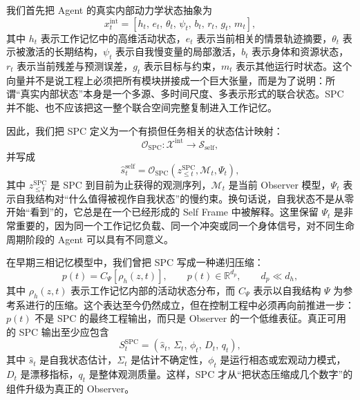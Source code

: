 我们首先把 Agent 的真实内部动力学状态抽象为
\begin{equation}
x_t^{\mathrm{int}}
=
\left[
h_t,\,
e_t,\,
\theta_t,\,
\psi_t,\,
b_t,\,
r_t,\,
g_t,\,
m_t
\right],
\end{equation}
其中 $h_t$ 表示工作记忆中的高维活动状态，$e_t$ 表示当前相关的情景轨迹摘要，$\theta_t$ 表示被激活的长期结构，$\psi_t$ 表示自我慢变量的局部激活，$b_t$ 表示身体和资源状态，$r_t$ 表示当前残差与预测误差，$g_t$ 表示目标与约束，$m_t$ 表示其他运行时状态。这个向量并不是说工程上必须把所有模块拼接成一个巨大张量，而是为了说明：所谓“真实内部状态”本身是一个多源、多时间尺度、多表示形式的联合状态。SPC 并不能、也不应该把这一整个联合空间完整复制进入工作记忆。

因此，我们把 SPC 定义为一个有损但任务相关的状态估计映射：
\begin{equation}
\mathcal O_{\mathrm{SPC}}:
\mathcal X^{\mathrm{int}}
\longrightarrow
\mathcal S_{\mathrm{self}},
\end{equation}
并写成
\begin{equation}
\hat s_t^{\mathrm{self}}
=
\mathcal O_{\mathrm{SPC}}
\left(
z_{\leq t}^{\mathrm{SPC}},
\mathcal M_t,
\Psi_t
\right),
\end{equation}
其中 $z_{\leq t}^{\mathrm{SPC}}$ 是 SPC 到目前为止获得的观测序列，$\mathcal M_t$ 是当前 Observer 模型，$\Psi_t$ 表示自我结构对“什么值得被视作自我状态”的慢约束。换句话说，自我状态不是从零开始“看到”的，它总是在一个已经形成的 Self Frame 中被解释。这里保留 $\Psi_t$ 是非常重要的，因为同一个工作记忆负载、同一个冲突或同一个身体信号，对不同生命周期阶段的 Agent 可以具有不同意义。

在早期三相记忆模型中，我们曾把 SPC 写成一种递归压缩：
\begin{equation}
p(t)
=
C_{\Psi}
\left[
\rho_h(z,t)
\right],
\qquad
p(t)\in\mathbb R^{d_p},
\qquad
d_p\ll d_h,
\end{equation}
其中 $\rho_h(z,t)$ 表示工作记忆内部的活动状态分布，而 $C_{\Psi}$ 表示以自我结构 $\Psi$ 为参考系进行的压缩。这个表达至今仍然成立，但在控制工程中必须再向前推进一步：$p(t)$ 不是 SPC 的最终工程输出，而只是 Observer 的一个低维表征。真正可用的 SPC 输出至少应包含
\begin{equation}
S_t^{\mathrm{SPC}}
=
\left(
\hat s_t,\,
\Sigma_t,\,
\phi_t,\,
D_t,\,
q_t
\right),
\end{equation}
其中 $\hat s_t$ 是自我状态估计，$\Sigma_t$ 是估计不确定性，$\phi_t$ 是运行相态或宏观动力模式，$D_t$ 是漂移指标，$q_t$ 是整体观测质量。这样，SPC 才从“把状态压缩成几个数字”的组件升级为真正的 Observer。

